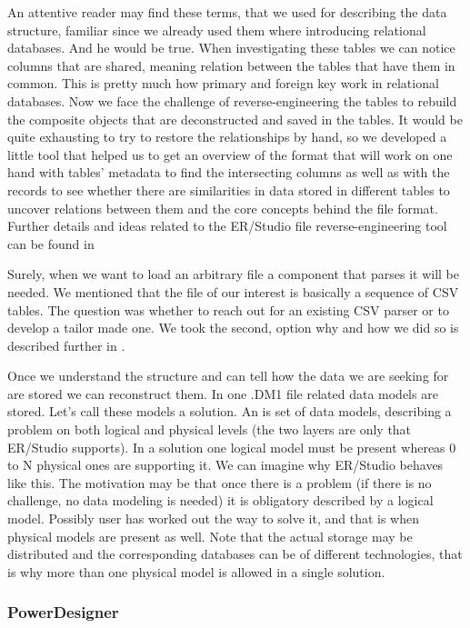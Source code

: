 An attentive reader may find these terms, that we used for describing the data structure, familiar since we already used them where introducing relational databases. And he would be true. When investigating these tables we can notice columns that are shared, meaning relation between the tables that have them in common. This is pretty much how primary and foreign key work in relational databases.
Now we face the challenge of reverse-engineering the tables to rebuild the composite objects that are deconstructed and saved in the tables.
It would be quite exhausting to try to restore the relationships by hand, so we developed a little tool that helped us to get an overview of the format that will work on one hand with tables' metadata to find the intersecting columns as well as with the records to see whether there are similarities in data stored in different tables to uncover relations between them and the core concepts behind the file format.
Further details and ideas related to the ER/Studio file reverse-engineering tool can be found in 

Surely, when we want to load an arbitrary file a component that parses it will be needed. 
We mentioned that the file of our interest is basically a sequence of CSV tables. The question was whether to reach out for an existing CSV parser or to develop a tailor made one. We took the second, option why and how we did so is described further in .

Once we understand the structure and can tell how the data we are seeking for are stored we can reconstruct them.
In one .DM1 file related data models are stored. Let's call these models a solution. An  is set of data models, describing a problem on both logical and physical levels (the two layers are only that ER/Studio supports). In a solution one logical model must be present whereas 0 to N physical ones are supporting it. 
We can imagine why ER/Studio behaves like this. The motivation may be that once there is a problem (if there is no challenge, no data modeling is needed) it is obligatory described by a logical model. Possibly user has worked out the way to solve it, and that is when physical models are present as well. 
Note that the actual storage may be distributed and the corresponding databases can be of different technologies, that is why more than one physical model is allowed in a single solution.

\subsubsection{PowerDesigner}

